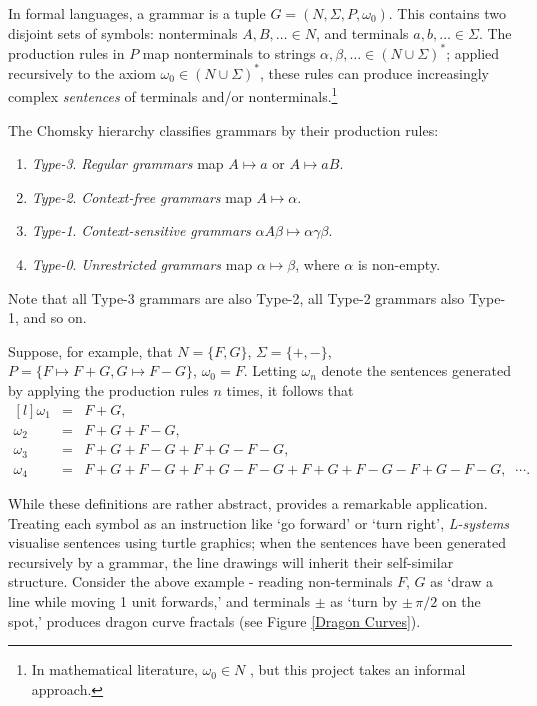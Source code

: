\documentclass[a4paper, 11pt]{article}
\begin{document}
\begin{flushleft}
\newpage\noindent
In formal languages, a grammar is a tuple $G = (N,\Sigma,P,\omega_0)$. This contains two disjoint sets of symbols: nonterminals $A, B, \dots \in N$, and terminals $a, b, \dots \in \Sigma$. The production rules in $P$ map nonterminals to strings $\alpha, \beta, \dots \in (N\cup\Sigma)^*$; applied recursively to the axiom $\omega_0 \in (N\cup\Sigma)^*$, these rules can produce increasingly complex \textit{sentences} of terminals and/or nonterminals.\footnote{In mathematical literature, $
\omega_0 \in N$ \citep*{hopcroftFormalLanguages}, but this project takes an informal approach.}

\vspace{5pt}\noindent
The Chomsky hierarchy \citep{chomskyHierarchy} %
classifies grammars by their production rules:
\begin{enumerate}[label=,itemsep=0em]
\item \textit{Type-3}. \textit{Regular grammars} map $A \mapsto a$ or $A \mapsto aB$.
\item \textit{Type-2}. \textit{Context-free grammars} map $A \mapsto \alpha$.
\item \textit{Type-1}. \textit{Context-sensitive grammars} $\alpha A\beta \mapsto \alpha\gamma\beta$.
\item \textit{Type-0}. \textit{Unrestricted grammars} map $\alpha \mapsto \beta$, where $\alpha$ is non-empty.
\end{enumerate}
Note that all Type-3 grammars are also Type-2, all Type-2 grammars also Type-1, and so on.

\vspace{5pt}\noindent
Suppose, for example, that $N = \{F, G\}$, $\Sigma = \{+, -\}$, $P = \{F \mapsto F+G, G \mapsto F-G\}$, $\omega_0 = F$.
Letting $\omega_n$ denote the sentences generated by applying the production rules $n$ times, it follows that
$$\begin{matrix*}[l]
\omega_1 &= &F+G, \\
\omega_2 &= &F+G+F-G, \\
\omega_3 &= &F+G+F-G+F+G-F-G, \\
\omega_4 &= &F+G+F-G+F+G-F-G+F+G+F-G-F+G-F-G, \;\; \cdots.
\end{matrix*}$$

\vspace{5pt}\noindent
While these definitions are rather abstract, \citet{lindenmayerLSystems} provides a remarkable application. Treating each symbol as an instruction like `go forward' or `turn right', \textit{L-systems} visualise sentences using turtle graphics; when the sentences have been generated recursively by a grammar, the line drawings will inherit their self-similar structure. Consider the above example - reading non-terminals $F$, $G$ as `draw a line while moving 1 unit forwards,' and terminals $\pm$ as `turn by $\pm\, \pi/2$ on the spot,' produces dragon curve fractals (see Figure \ref{Dragon Curves}).


\end{flushleft}
\end{document}
